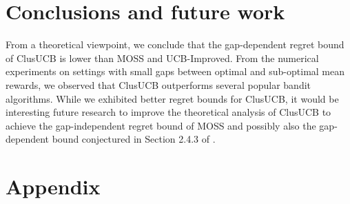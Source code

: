 \documentclass[twoside]{article}
\begin{document}
\section{Conclusions and future work}
\label{sec:conclusions}
From a theoretical viewpoint, we conclude that the gap-dependent regret bound of ClusUCB is lower than MOSS and UCB-Improved. From the numerical experiments on settings with small gaps between optimal and sub-optimal mean rewards, we observed that ClusUCB outperforms several popular bandit algorithms. 
While we exhibited better regret bounds for ClusUCB, it would be interesting future research to improve the theoretical analysis of ClusUCB to achieve the gap-independent regret bound of MOSS and possibly also the gap-dependent bound conjectured in Section 2.4.3 of \cite{bubeck2012regret}.


\clearpage
\newpage





\clearpage
\newpage
\onecolumn
\section*{Appendix}


\end{document}
